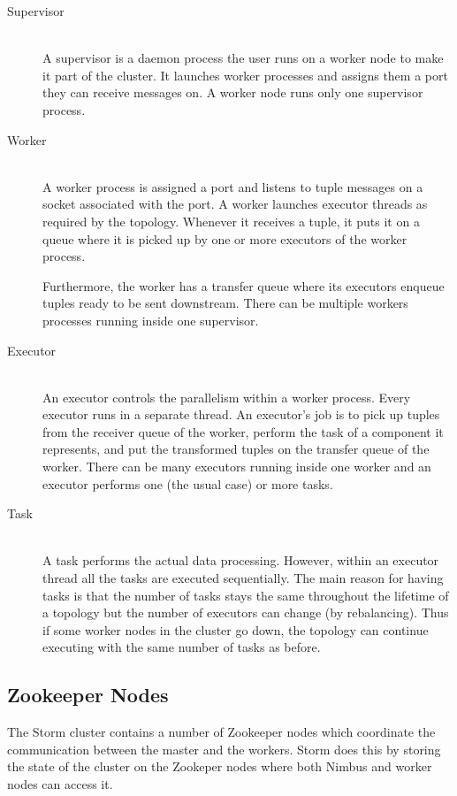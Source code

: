 \documentclass[bsc,logo,frontabs,twoside,singlespacing,normalheadings,parskip]{infthesis}     %
\begin{document}
\begin{description}
	\item[Supervisor] \hfill \\
	A supervisor is a daemon process the user runs on a worker node to make it part of the cluster. It launches worker processes and assigns them a port they can receive messages on. A worker node runs only one supervisor process.
	\item[Worker] \hfill \\
	A worker process is assigned a port and listens to tuple messages on a socket associated with the port. A worker launches executor threads as required by the topology. Whenever it receives a tuple, it puts it on a queue where it is picked up by one or more executors of the worker process.
	
	Furthermore, the worker has a transfer queue where its executors enqueue tuples ready to be sent downstream. There can be multiple workers processes running inside one supervisor.
	\item[Executor] \hfill \\
	An executor controls the parallelism within a worker process. Every executor runs in a separate thread. An executor's job is to pick up tuples from the receiver queue of the worker, perform the task of a component it represents, and put the transformed tuples on the transfer queue of the worker. There can be many executors running inside one worker and an executor performs one (the usual case) or more tasks.
	\item[Task] \hfill \\
	A task performs the actual data processing. However, within an executor thread all the tasks are executed sequentially. The main reason for having tasks is that the number of tasks stays the same throughout the lifetime of a topology but the number of executors can change (by rebalancing). Thus if some worker nodes in the cluster go down, the topology can continue executing with the same number of tasks as before.
\end{description}

\subsection{Zookeeper Nodes}

The Storm cluster contains a number of Zookeeper nodes which coordinate the communication between the master and the workers. Storm does this by storing the state of the cluster on the Zookeper nodes where both Nimbus and worker nodes can access it.
\end{document}
